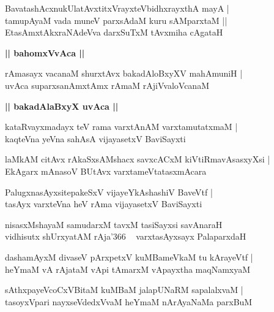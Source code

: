 \documentclass[twoside,12pt,openright]{book}
\newcounter{shloka}[chapter]
\def\uvaca#1{\centerline{{\large\textbf{#1}}}}
\begin{document}
\begin{shloka}%
BavatashAcxnukUlatAvxtitxVrayxteVbidhxrayxthA mayA |\\
tamupAyaM vada muneV parxsAdaM kuru sAMparxtaM ||\\
EtasAmxtAkxraNAdeVva darxSuTxM tAvxmiha cAgataH
\end{shloka}

\uvaca{|| bahomxVvAca ||}

\begin{shloka}%
rAmasayx vacanaM shurxtAvx bakadAloBxyXV mahAmuniH |\\
uvAca suparxsanAmxtAmx rAmaM rAjiVvaloVcanaM 
\end{shloka}

\uvaca{|| bakadAlaBxyX uvAca ||}

\begin{shloka}%
kataRvayxmadayx teV rama varxtAnAM varxtamutatxmaM |\\
kaqteVna yeVna sahAsA vijayasetxV BaviSayxti
\end{shloka}

\begin{shloka}%
laMkAM citAvx rAkaSxsAMshacx savxcACxM kiVtiRmavAsasxyXsi |\\
EkAgarx mAnasoV BUtAvx varxtameVtatasxmAcara 
\end{shloka}

\begin{shloka}%
PalugxnasAyxsitepakeSxV vijayeYkAshashiV BaveVtf |\\
tasAyx varxteVna heV rAma vijayasetxV BaviSayxti
\end{shloka}

\begin{shloka}%
nisasxMshayaM samudarxM tavxM tasiSayxsi savAnaraH \\
vidhisutx shUrxyatAM rAja\char'366 ~ varxtasAyxsayx PalaparxdaH
\end{shloka}

\begin{shloka}%
dashamAyxM divaseV pArxpetxV kuMBameVkaM tu kArayeVtf |\\
heYmaM vA rAjataM vApi tAmarxM vApayxtha maqNamxyaM 
\end{shloka}

\begin{shloka}%
sAthxpayeVcoCxVBitaM kuMBaM jalapUNaRM sapalalxvaM |\\
tasoyxVpari nayxseVdedxVvaM heYmaM nArAyaNaMa parxBuM
\end{shloka}
\end{document}
